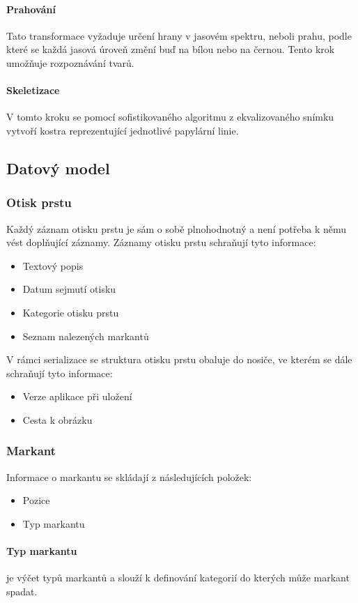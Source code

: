 \documentclass[12pt,a4paper]{article}
\begin{document}
\paragraph{Prahování}
Tato transformace vyžaduje určení hrany v jasovém spektru, neboli prahu, podle které se každá jasová úroveň změní buď na bílou nebo na černou. Tento krok umožňuje rozpoznávání tvarů.
\paragraph{Skeletizace}
V tomto kroku se pomocí sofistikovaného algoritmu z ekvalizovaného snímku vytvoří kostra reprezentující jednotlivé papylární linie.

\subsection{Datový model}
\subsubsection{Otisk prstu}
Každý záznam otisku prstu je sám o sobě plnohodnotný a není potřeba k němu vést doplňující záznamy. Záznamy otisku prstu schraňují tyto informace:
\begin{itemize}
\setlength\itemsep{-0.3cm}
\item Textový popis
\item Datum sejmutí otisku
\item Kategorie otisku prstu
\item Seznam nalezených markantů
\end{itemize}
V rámci serializace se struktura otisku prstu obaluje do nosiče, ve kterém se dále schraňují tyto informace:
\begin{itemize}
\setlength\itemsep{-0.3cm}
\item Verze aplikace při uložení
\item Cesta k obrázku
\end{itemize}
\subsubsection{Markant}
Informace o markantu se skládají z následujících položek:
\begin{itemize}
\setlength\itemsep{-0.3cm}
\item Pozice
\item Typ markantu
\end{itemize}
\paragraph{Typ markantu} je výčet typů markantů a slouží k definování kategorií do kterých může markant spadat.
\end{document}
